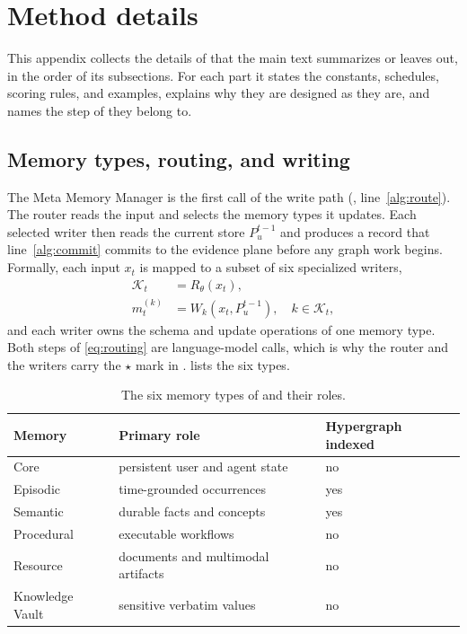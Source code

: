 \makeatletter\setlength{\@fptop}{0pt}\makeatother

\newpage

\section{Method details}
\label{app:method}

This appendix collects the details of  that the main text summarizes or leaves out, in the order of its
subsections. For each part it states the
constants, schedules, scoring rules, and examples, explains why they are
designed as they are, and names the step of  they belong to.

\subsection{Memory types, routing, and writing}
\label{app:method-routing}

The Meta Memory Manager is the first call of the write path
(, line~\ref{alg:route}). The router reads the input and
selects the memory types it updates. Each selected writer then reads the
current store \(P_u^{t-1}\) and produces a record that line~\ref{alg:commit}
commits to the evidence plane before any graph work begins. Formally, each
input \(x_t\) is mapped to a subset of six specialized writers,
\begin{equation}
    \begin{aligned}
    \mathcal K_t&=R_\theta(x_t),\\
    m_t^{(k)}&=W_k(x_t,P_u^{t-1}),\quad k\in\mathcal K_t,
    \end{aligned}
    \label{eq:routing}
\end{equation}
and each writer owns the schema and update operations of one memory type. Both
steps of \eqref{eq:routing} are language-model calls, which is why the router
and the writers carry the \(\star\) mark in .
 lists the six types.

\suppressfloats[t]
\begin{table}[t]
\centering
\caption{The six memory types of \ours and their roles.}
\label{tab:memory-types}
\small
\begin{tabular}{lll}
\toprule
Memory & Primary role & Hypergraph indexed \\
\midrule
Core & persistent user and agent state & no \\
Episodic & time-grounded occurrences & yes \\
Semantic & durable facts and concepts & yes \\
Procedural & executable workflows & no \\
Resource & documents and multimodal artifacts & no \\
Knowledge Vault & sensitive verbatim values & no \\
\bottomrule
\end{tabular}
\end{table}

